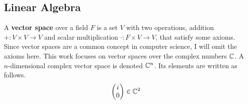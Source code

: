 \subsection{Linear Algebra}

A \textbf{vector space} over a field $F$ is a set $V$ with two operations, addition $+: V \times V \to V$ and scalar multiplication $\cdot: F \times V \to V$, that satisfy some axioms.
Since vector spaces are a common concept in computer science, I will omit the axioms here.
This work focuses on vector spaces over the complex numbers $\mathbb{C}$.
A $n$-dimensional complex vector space is denoted $\mathbb{C}^n$.
Its elements are written as follows.
\begin{align}
    \begin{pmatrix}
        i \\ 0
    \end{pmatrix} \in \mathbb{C}^2
\end{align}
